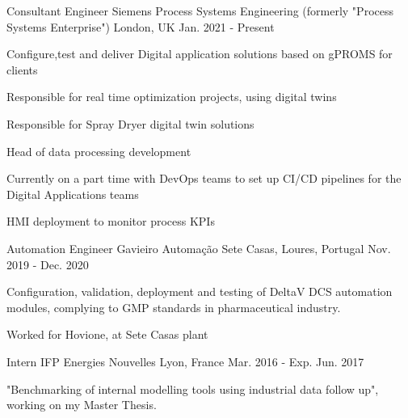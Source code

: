 

\begin{cventries}

  \cventry
    {Consultant Engineer} %
    {Siemens Process Systems Engineering (formerly "Process Systems Enterprise")} %
    {London, UK} %
    {Jan. 2021 - Present} %
    {
      \begin{cvitems} %
        \item {Configure,test and deliver Digital application solutions based on gPROMS for clients}
        \item {Responsible for real time optimization projects, using digital twins}
        \item {Responsible for Spray Dryer digital twin solutions}
        \item {Head of data processing development}
        \item {Currently on a part time with DevOps teams to set up CI/CD pipelines for the Digital Applications teams}
        \item {HMI deployment to monitor process KPIs}
      \end{cvitems}
    }

  \cventry
    {Automation Engineer} %
    {Gavieiro Automação} %
    {Sete Casas, Loures, Portugal} %
    {Nov. 2019 - Dec. 2020} %
    {
      \begin{cvitems} %
        \item {Configuration, validation, deployment and testing of DeltaV DCS automation modules, complying to GMP standards in pharmaceutical industry.}
        \item {Worked for Hovione, at Sete Casas plant}
      \end{cvitems}
    }

  \cventry
    {Intern} %
    {IFP Energies Nouvelles} %
    {Lyon, France} %
    {Mar. 2016 - Exp. Jun. 2017} %
    {
      \begin{cvitems} %
        \item {"Benchmarking of internal modelling tools using industrial data follow up", working on my Master Thesis.}
      \end{cvitems}
    }


\end{cventries}
